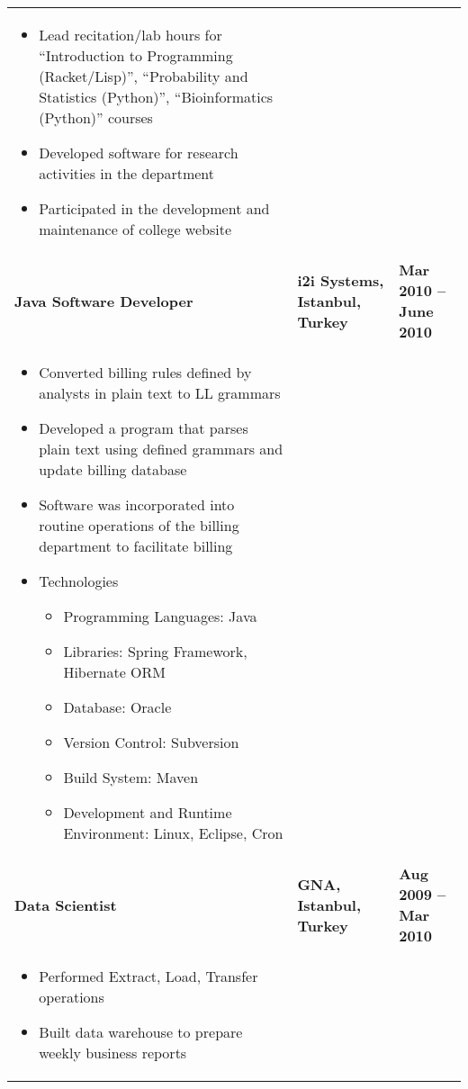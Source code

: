 \documentclass[a4paper,10pt]{article}
\begin{document}
\begin{longtable}{p{7cm}p{7cm}p{6cm}}
  \parbox{18cm}{
    \begin{itemize}[topsep=0.2cm]
      \item Lead recitation/lab hours for ``Introduction to Programming (Racket/Lisp)'', ``Probability and Statistics (Python)'', ``Bioinformatics (Python)'' courses
      \item Developed software for research activities in the department
      \item Participated in the development and maintenance of college website
    \end{itemize}
  }\\
   \textbf{Java Software Developer} & \textbf{i2i Systems, Istanbul, Turkey} & \textbf{Mar 2010 -- June 2010}\\
  \parbox{18cm}{
    \begin{itemize}
      \item Converted billing rules defined by analysts in plain text to LL grammars
    \end{itemize}
    \begin{itemize}
      \item Developed a program that parses plain text using defined grammars and update billing database
      \item Software was incorporated into routine operations of the billing department to facilitate billing
      \item Technologies
      \begin{itemize}[topsep=-0.2cm]
        \item Programming Languages: Java
        \item Libraries: Spring Framework, Hibernate ORM
        \item Database: Oracle
        \item Version Control: Subversion
        \item Build System: Maven
        \item Development and Runtime Environment: Linux, Eclipse, Cron
      \end{itemize}
    \end{itemize}
  }\\
   \textbf{Data Scientist} & \textbf{GNA, Istanbul, Turkey} & \textbf{Aug 2009 -- Mar 2010}\\
  \parbox{18cm}{
    \begin{itemize}
      \item Performed Extract, Load, Transfer operations
      \item Built data warehouse to prepare weekly business reports

\end{itemize}}
\end{longtable}
\end{document}
